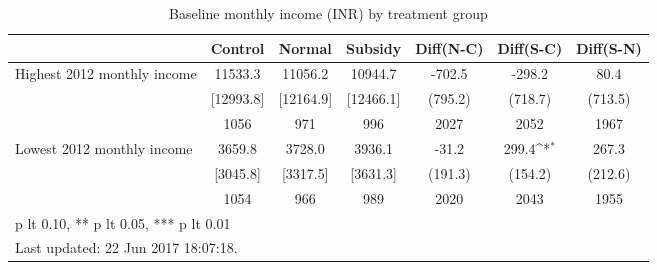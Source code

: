 \begin{table}[htbp]\centering
\def\sym#1{\ifmmode^{#1}\else\(^{#1}\)\fi}
\caption{Baseline monthly income (INR) by treatment group \label{tab:"balance"}}
\begin{tabular*}{1\hsize}{@{\hskip\tabcolsep\extracolsep\fill}l*{1}{cccccc}}
\toprule
                                &  Control&   Normal&  Subsidy&Diff(N-C)         &Diff(S-C)         &Diff(S-N)         \\
\midrule
Highest 2012 monthly income     &  11533.3&  11056.2&  10944.7&   -702.5         &   -298.2         &     80.4         \\
                                &[12993.8]&[12164.9]&[12466.1]&  (795.2)         &  (718.7)         &  (713.5)         \\
                                &     1056&      971&      996&     2027         &     2052         &     1967         \\
Lowest 2012 monthly income      &   3659.8&   3728.0&   3936.1&    -31.2         &    299.4\sym{*}  &    267.3         \\
                                & [3045.8]& [3317.5]& [3631.3]&  (191.3)         &  (154.2)         &  (212.6)         \\
                                &     1054&      966&      989&     2020         &     2043         &     1955         \\
\bottomrule
\multicolumn{7}{l}{\footnotesize * p lt 0.10, ** p lt 0.05, *** p lt 0.01}\\
\multicolumn{7}{l}{\footnotesize Last updated: 22 Jun 2017 18:07:18.}\\
\end{tabular*}
\end{table}
